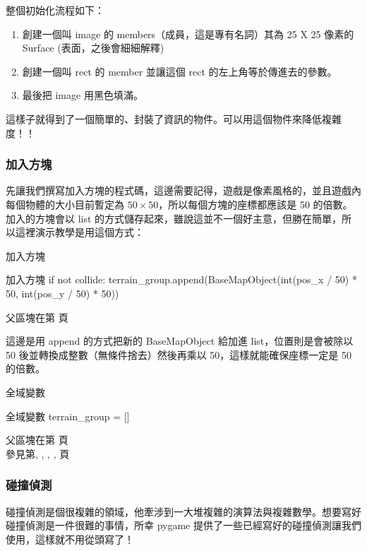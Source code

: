 \documentclass[12pt, a4paper]{siweb}
\begin{document}
整個初始化流程如下：

\begin{enumerate}
\item 創建一個叫 image 的 members（成員，這是專有名詞）其為 25 X 25 像素的 Surface (表面，之後會細細解釋)
\item 創建一個叫 rect 的 member 並讓這個 rect 的左上角等於傳進去的參數。
\item 最後把 image 用黑色填滿。
\end{enumerate}

這樣子就得到了一個簡單的、封裝了資訊的物件。可以用這個物件來降低複雜度！！

\subsubsection{加入方塊}

先讓我們撰寫加入方塊的程式碼，這邊需要記得，遊戲是像素風格的，並且遊戲內每個物體的大小目前暫定為 $50 \times 50$，所以每個方塊的座標都應該是 50 的倍數。加入的方塊會以 list 的方式儲存起來，雖說這並不一個好主意，但勝在簡單，所以這裡演示教學是用這個方式：

\begin{siweb}{加入方塊}
\begin{mylisting}{加入方塊}
if not collide:
	terrain_group.append(BaseMapObject(int(pos_x / 50) * 50, int(pos_y / 50) * 50))
\end{mylisting}
\label{加入方塊_0}
父區塊在第\pageref{加入方塊_father} 頁
\end{siweb}

這邊是用 append 的方式把新的 BaseMapObject 給加進 list，位置則是會被除以 50 後並轉換成整數（無條件捨去）然後再乘以 50，這樣就能確保座標一定是 50 的倍數。

\begin{siweb}{全域變數}
\begin{mylisting}{全域變數}
terrain_group = []
\end{mylisting}
\label{全域變數_1}
父區塊在第\pageref{全域變數_father} 頁\\參見第\pageref{全域變數_0}, \pageref{全域變數_1}, \pageref{全域變數_2}, \pageref{全域變數_3}, 頁
\end{siweb}

\subsubsection{碰撞偵測}

碰撞偵測是個很複雜的領域，他牽涉到一大堆複雜的演算法與複雜數學。想要寫好碰撞偵測是一件很難的事情，所幸 pygame 提供了一些已經寫好的碰撞偵測讓我們使用，這樣就不用從頭寫了！
\end{document}
